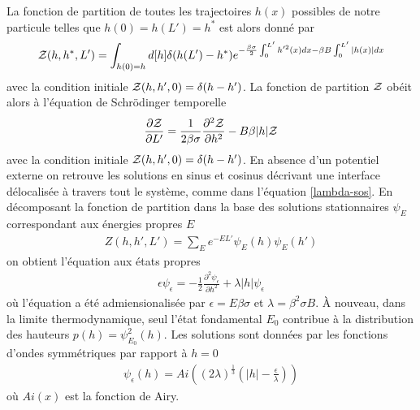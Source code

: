 La fonction de partition de toutes les trajectoires $h(x)$ possibles de notre particule telles que $h(0)=h(L')=h^\ast$ est alors donné par
\begin{align}
	\mathcal{Z}(h,h^\ast,L') = \int_{h(0)=h} d[h] \delta(h(L')-h^\ast)e^{-\frac{\beta \sigma}{2} \int_0^{L'} h'^2(x) dx -\beta B \int_0^{L'} |h(x)|dx}
\end{align}
avec la condition initiale $\mathcal{Z}(h,h',0)=\delta(h-h')$. La fonction de partition $\mathcal{Z}$ obéit alors à l'équation de Schrödinger temporelle
\begin{align}
	\frac{\partial \mathcal{Z}}{\partial {L'}} = \frac{1}{2 \beta \sigma} \frac{\partial^2 \mathcal{Z}}{\partial h^2}  - B \beta |h| \mathcal{Z}
\end{align}
avec la condition initiale $\mathcal{Z}(h,h',0) = \delta(h-h')$.  En absence d'un potentiel externe on retrouve les solutions en sinus et cosinus décrivant une interface délocalisée à travers tout le système, comme dans l'équation \ref{lambda-sos}. En décomposant la fonction de partition dans la base des solutions stationnaires $\psi_E$ correspondant aux énergies propres $E$ 
\begin{align}
	Z(h,h',L') = \sum_E e^{-EL'}\psi_E(h) \psi_E(h')
	\label{schro_temp}
\end{align}
on obtient l'équation aux états propres
\begin{align}
	\epsilon \psi_\epsilon = - \frac{1}{2} \frac{\partial^2 \psi_\epsilon}{\partial h^2} + \lambda |h| \psi_\epsilon
\end{align}
où l'équation a été admiensionalisée par $\epsilon = E\beta\sigma$ et $\lambda=\beta^2 \sigma B$. À nouveau, dans la limite thermodynamique, seul l'état fondamental $E_0$ contribue à la distribution des hauteurs $p(h) = \psi_{E_0}^2(h)$.
Les solutions sont données par les fonctions d'ondes symmétriques par rapport à $h=0$
\begin{align}
	\psi_\epsilon (h) = Ai \left( (2\lambda)^\frac{1}{3}(|h|-\frac{\epsilon}{\lambda}) \right)
\end{align}
où $Ai(x)$ est la fonction de Airy. 

